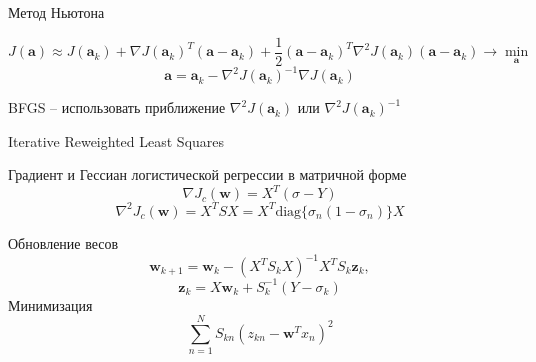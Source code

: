 \documentclass[10pt]{beamer}
\begin{document}
\begin{frame}{Метод Ньютона}

\[
J(\mathbf{a}) \approx J(\mathbf{a}_k) + \nabla J(\mathbf{a}_k)^T (\mathbf{a} - \mathbf{a}_k) + \frac 1 2 (\mathbf{a} - \mathbf{a}_k)^T \nabla^2 J(\mathbf{a}_k) (\mathbf{a} - \mathbf{a}_k) \rightarrow \min_{\mathbf{a}}
\]
\[
\mathbf{a} = \mathbf{a}_k - \nabla^2 J(\mathbf{a}_k)^{-1} \nabla J(\mathbf{a}_k)
\]

\newton

BFGS -- использовать приближение $\nabla^2 J(\mathbf{a}_k)$ или $\nabla^2 J(\mathbf{a}_k)^{-1}$

\end{frame}

\begin{frame}{Iterative Reweighted Least Squares}

Градиент и Гессиан логистической регрессии в матричной форме
\[
\nabla J_c(\mathbf{w}) = X^T (\sigma - Y)
\]
\[
\nabla^2 J_c(\mathbf{w}) = X^T S X = X^T \text{diag}\{\sigma_n (1 - \sigma_n)\} X
\]

Обновление весов
\[
\mathbf{w}_{k+1} = \mathbf{w}_k - (X^T S_k X)^{-1} X^T S_k \mathbf{z}_k,
\]
\[
\mathbf{z}_k = X \mathbf{w}_k + S^{-1}_k (Y - \sigma_k)
\]
Минимизация
\[
\sum_{n=1}^N S_{kn} (z_{kn} - \mathbf{w}^T x_n)^2
\]

\end{frame}
\end{document}
